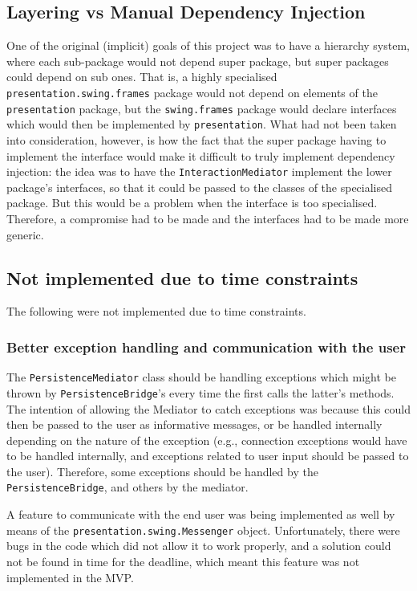 \subsection{Layering vs Manual Dependency Injection}
One of the original (implicit) goals of this project was to have a hierarchy
system, where each sub-package would not depend super package, but super
packages could depend on sub ones. That is, a highly specialised
\texttt{presentation.swing.frames} package would not depend on elements of the
\texttt{presentation} package, but the \texttt{swing.frames} package would
declare interfaces which would then be implemented by \texttt{presentation}.
What had not been taken into consideration, however, is how the fact that the
super package having to implement the interface would make it difficult to
truly implement dependency injection: the idea was to have the
\texttt{InteractionMediator} implement the lower package's interfaces, so that
it could be passed to the classes of the specialised package. But this would be
a problem when the interface is too specialised. Therefore, a compromise had to
be made and the interfaces had to be made more generic.

\subsection{Not implemented due to time constraints} \label{sec:Reflections.TimeConstraints}
The following were not implemented due to time constraints.

\subsubsection{Better exception handling and communication with the user}
The \texttt{PersistenceMediator} class should be handling exceptions which
might be thrown by \texttt{PersistenceBridge}'s every time the first calls the
latter's methods. The intention of allowing the Mediator to catch exceptions
was because this could then be passed to the user as informative messages, or
be handled internally depending on the nature of the exception (e.g.,
connection exceptions would have to be handled internally, and exceptions
related to user input should be passed to the user). Therefore, some exceptions
should be handled by the \texttt{PersistenceBridge}, and others by the
mediator.

A feature to communicate with the end user was being implemented as well by
means of the \texttt{presentation.swing.Messenger} object. Unfortunately, there
were bugs in the code which did not allow it to work properly, and a solution
could not be found in time for the deadline, which meant this feature was not
implemented in the MVP.

